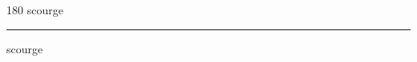 
\begin{frame}
\begin{center}
\begin{turn}{180}
{\fontsize{2.5cm}{1em}\selectfont scourge}
\end{turn}
\vspace{1em}\par  
\hrule
\vspace{1em}\par  
{\fontsize{2.5cm}{1em}\selectfont scourge}
\end{center}
\end{frame}

